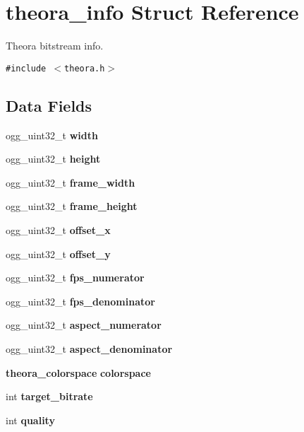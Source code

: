 \section{theora\_\-info Struct Reference}
\label{structtheora__info}
Theora bitstream info.  


{\tt \#include $<$theora.h$>$}

\subsection*{Data Fields}
\begin{CompactItemize}
\item 
ogg\_\-uint32\_\-t {\bf width}\label{structtheora__info_o0}

\item 
ogg\_\-uint32\_\-t {\bf height}\label{structtheora__info_o1}

\item 
ogg\_\-uint32\_\-t {\bf frame\_\-width}\label{structtheora__info_o2}

\item 
ogg\_\-uint32\_\-t {\bf frame\_\-height}\label{structtheora__info_o3}

\item 
ogg\_\-uint32\_\-t {\bf offset\_\-x}\label{structtheora__info_o4}

\item 
ogg\_\-uint32\_\-t {\bf offset\_\-y}\label{structtheora__info_o5}

\item 
ogg\_\-uint32\_\-t {\bf fps\_\-numerator}\label{structtheora__info_o6}

\item 
ogg\_\-uint32\_\-t {\bf fps\_\-denominator}\label{structtheora__info_o7}

\item 
ogg\_\-uint32\_\-t {\bf aspect\_\-numerator}\label{structtheora__info_o8}

\item 
ogg\_\-uint32\_\-t {\bf aspect\_\-denominator}\label{structtheora__info_o9}

\item 
{\bf theora\_\-colorspace} {\bf colorspace}\label{structtheora__info_o10}

\item 
int {\bf target\_\-bitrate}\label{structtheora__info_o11}

\item 
int {\bf quality}\label{structtheora__info_o12}


\end{CompactItemize}
